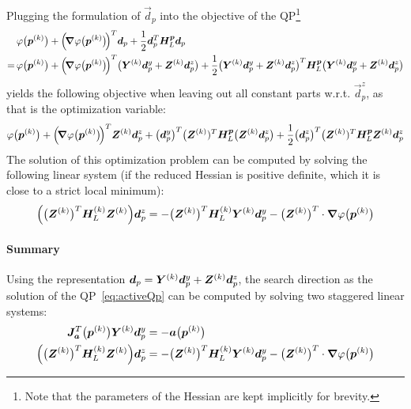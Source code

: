 				Plugging the formulation of \( \vec{d}_p \) into the objective of the QP\footnote{Note that the parameters of the Hessian are kept implicitly for brevity.}
				\begin{align*}
					  & \, \varphi\big(\bm{p}^{(k)}\big) + \Big(\!\grad{\varphi}\big(\bm{p}^{(k)}\big)\!\Big)^T \bm{d}_p + \frac{1}{2} \bm{d}_p^T \bm{H}_L^{\bm{p}} \bm{d}_p                                                                                                                                                                         \\
					= & \, \varphi\big(\bm{p}^{(k)}\big) + \Big(\!\grad{\varphi}\big(\bm{p}^{(k)}\big)\!\Big)^T \big( \bm{Y}^{(k)} \bm{d}_p^y + \bm{Z}^{(k)} \bm{d}_p^z \big) + \frac{1}{2} \big( \bm{Y}^{(k)} \bm{d}_p^y + \bm{Z}^{(k)} \bm{d}_p^z \big)^T \bm{H}_L^{\bm{p}} \big( \bm{Y}^{(k)} \bm{d}_p^y + \bm{Z}^{(k)} \bm{d}_p^z \big)
				\end{align*}
				yields the following objective when leaving out all constant parts w.r.t. \( \vec{d}_p^z \), as that is the optimization variable:
				\begin{align*}
					\varphi\big(\bm{p}^{(k)}\big) + \Big(\!\grad{\varphi}\big(\bm{p}^{(k)}\big)\!\Big)^T \bm{Z}^{(k)} \bm{d}_p^z + \big(\bm{d}_p^y\big)^T \big(\bm{Z}^{(k)})^T \bm{H}_L^{\bm{p}} \big( \bm{Z}^{(k)} \bm{d}_p^z \big) + \frac{1}{2} \big(\bm{d}_p^z\big)^T \big(\bm{Z}^{(k)})^T \bm{H}_L^{\bm{p}} \bm{Z}^{(k)} \bm{d}_p^z
				\end{align*}
				The solution of this optimization problem can be computed by solving the following linear system (if the reduced Hessian is positive definite, which it is close to a strict local minimum):
				\begin{align*}
					\Big( \big(\bm{Z}^{(k)}\big)^T \bm{H}_L^{(k)} \bm{Z}^{(k)} \Big) \bm{d}_p^z = -\big(\bm{Z}^{(k)}\big)^T \bm{H}_L^{(k)} \bm{Y}^{(k)} \bm{d}_p^y - \big(\bm{Z}^{(k)}\big)^T \cdot \grad{\varphi}\big(\bm{p}^{(k)}\big)
				\end{align*}

				\paragraph{Summary}
					Using the representation \( \bm{d}_p = \bm{Y}^{(k)} \bm{d}_p^y + \bm{Z}^{(k)} \bm{d}_p^z \), the search direction as the solution of the QP~\eqref{eq:activeQp} can be computed by solving two staggered linear systems:
					\begin{align*}
						\bm{J}_{\bm{a}}^T\big(\bm{p}^{(k)}\big) \bm{Y}^{(k)} \bm{d}_p^y            & = -\bm{a}\big(\bm{p}^{(k)}\big)                                                                                                              \\
						\Big( \big(\bm{Z}^{(k)}\big)^T \bm{H}_L^{(k)} \bm{Z}^{(k)} \Big) \bm{d}_p^z & = -\big(\bm{Z}^{(k)}\big)^T \bm{H}_L^{(k)} \bm{Y}^{(k)} \bm{d}_p^y - \big(\bm{Z}^{(k)}\big)^T \cdot \grad{\varphi}\big(\bm{p}^{(k)}\big)
					\end{align*}

